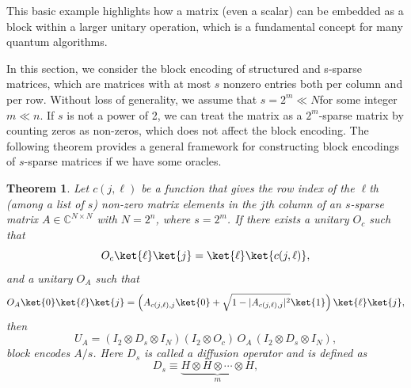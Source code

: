 \documentclass{article}
\newtheorem{theorem}{Theorem}[section]
\begin{document}
This basic example highlights how a matrix (even a scalar) can be embedded as a block within a larger unitary operation, which is a fundamental concept for many quantum algorithms.

In this section, we consider the block encoding of structured and s-sparse matrices, which are matrices with at most $s$ nonzero entries both per column and per row. Without loss of generality, we assume that $s = 2^m\ll N$for some integer $m \ll n$.
If $s$ is not a power of 2, we can treat the matrix as a $2^m$-sparse matrix by counting zeros as non-zeros, which does not affect the block encoding. The following theorem provides a general framework for constructing block encodings of $s$-sparse matrices if we have some oracles.

\begin{theorem}
  \label{thm:main_result}
  Let $c(j, \ell)$ be a function that gives the row index of the $\ell$th (among a list of $s$) non-zero matrix elements in the $j$th column of an $s$-sparse matrix $A \in \mathbb{C}^{N \times N}$ with $N = 2^n$, where $s = 2^m$. If there exists a unitary $O_c$ such that
  \begin{equation}
    O_c \ket{\ell} \ket{j} = \ket{\ell} \ket{c(j, \ell)},\label{eq:equation4}
  \end{equation}
  and a unitary $O_A$ such that
  \begin{equation}
    O_A \ket{0} \ket{\ell} \ket{j} = \left( A_{c(j, \ell), j} \ket{0} + \sqrt{1 - |A_{c(j, \ell), j}|^2} \ket{1} \right) \ket{\ell} \ket{j},\label{eq:equation5}
  \end{equation}
  then
  \begin{equation}
    U_A = (I_2 \otimes D_s \otimes I_N)(I_2 \otimes O_c) \, O_A \, (I_2 \otimes D_s \otimes I_N),\label{eq:equation6}
  \end{equation}
  block encodes $A/s$. Here $D_s$ is called a diffusion operator and is defined as
  \begin{equation}
    D_s \equiv \underbrace{H \otimes H \otimes \cdots \otimes H}_{m},\label{eq:equation7}
  \end{equation}
\end{theorem}
\end{document}
